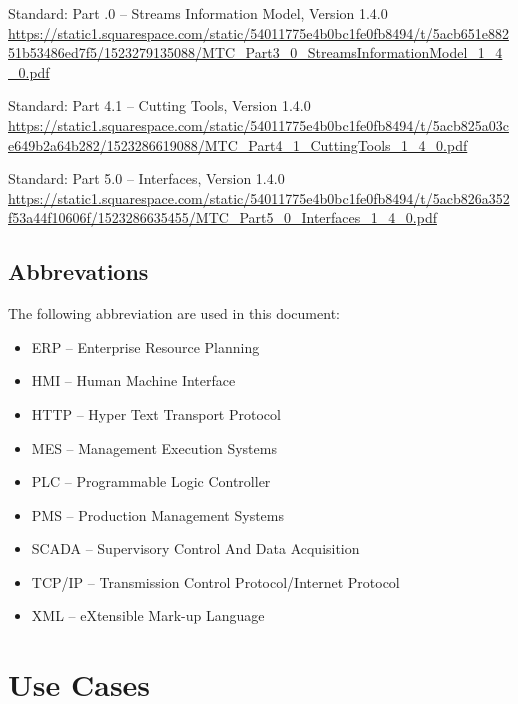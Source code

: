 \documentclass{mtconnect}	%
\begin{document}
\hang [MT Part 3.0]	\mtconnect Standard: Part .0 -- Streams Information Model, Version 1.4.0 \\
\url{https://static1.squarespace.com/static/54011775e4b0bc1fe0fb8494/t/5acb651e88251b53486ed7f5/1523279135088/MTC_Part3_0_StreamsInformationModel_1_4_0.pdf}

\hang [MT Part 4.0	\mtconnect Standard: Part 4 -- Assets Information Model, Version 1.4.0 \\
\url{https://static1.squarespace.com/static/54011775e4b0bc1fe0fb8494/t/5acb824a8a922dc773e19caf/1523286602677/MTC_Part4_0_AssetsInformationModel_1_4_0.pdf}

\hang [MT Part 4.1]	\mtconnect Standard: Part 4.1 -- Cutting Tools, Version 1.4.0 \\
\url{https://static1.squarespace.com/static/54011775e4b0bc1fe0fb8494/t/5acb825a03ce649b2a64b282/1523286619088/MTC_Part4_1_CuttingTools_1_4_0.pdf}

\hang [MT Part 5.0]	\mtconnect Standard: Part 5.0 -- Interfaces, Version 1.4.0 \\
\url{https://static1.squarespace.com/static/54011775e4b0bc1fe0fb8494/t/5acb826a352f53a44f10606f/1523286635455/MTC_Part5_0_Interfaces_1_4_0.pdf}

\subsection{Abbrevations}

The following abbreviation are used in this document:

\begin{itemize}
    \item ERP -- Enterprise Resource Planning
    \item HMI -- Human Machine Interface
    \item HTTP -- Hyper Text Transport Protocol
    \item MES -- Management Execution Systems
    \item PLC -- Programmable Logic Controller
    \item PMS -- Production Management Systems
    \item SCADA -- Supervisory Control And Data Acquisition
    \item TCP/IP -- Transmission Control Protocol/Internet Protocol
    \item XML -- eXtensible Mark-up Language
\end{itemize}

\section{Use Cases}
\end{document}
